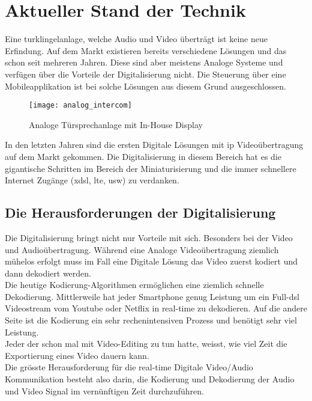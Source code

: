 \section{Aktueller Stand der Technik}
\label{sec:chapterexample}

Eine \gls{turklingelanlage}, welche Audio und Video überträgt ist keine neue Erfindung. Auf dem Markt existieren bereits verschiedene Lösungen und das schon seit mehreren Jahren. Diese sind aber meistens Analoge Systeme und verfügen über die Vorteile der Digitalisierung nicht. Die Steuerung über eine Mobileapplikation ist bei solche Lösungen aus diesem Grund ausgeschlossen.

\begin{figure}[htb!]
	\begin{center}
		\texttt{[image: analog\_intercom]}
		\caption[Analoge \gls{turklingelanlage} mit In-House Display]{Analoge Türsprechanlage mit In-House Display}
		\label{fig:analoge_intercom}
	\end{center}
\end{figure}

In den letzten Jahren sind die ersten Digitale Lösungen mit \gls{ip} Videoübertragung auf dem Markt gekommen. Die Digitalisierung in diesem Bereich hat es die gigantische Schritten im Bereich der Miniaturisierung und die immer schnellere Internet Zugänge (x\gls{dsl}, \gls{lte}, usw) zu verdanken.

\subsection{Die Herausforderungen der Digitalisierung}
Die Digitalisierung bringt nicht nur Vorteile mit sich. Besonders bei der Video und Audioübertragung. Während eine Analoge Videoübertragung ziemlich mühelos erfolgt muss im Fall eine Digitale Lösung das Video zuerst kodiert und dann dekodiert werden.
\\
Die heutige Kodierung-Algorithmen ermöglichen eine ziemlich schnelle Dekodierung. Mittlerweile hat jeder Smartphone genug Leistung um ein Full-\gls{dsl} Videostream vom Youtube oder Netflix in real-time zu dekodieren. Auf die andere Seite ist die Kodierung ein sehr rechenintensiven Prozess und benötigt sehr viel Leistung.
\\
Jeder der schon mal mit Video-Editing zu tun hatte, weisst, wie viel Zeit die Exportierung eines Video dauern kann.
\\
Die grösste Herausforderung für die real-time Digitale Video/Audio Kommunikation besteht also darin, die Kodierung und Dekodierung der Audio und Video Signal im vernünftigen Zeit durchzuführen. 

